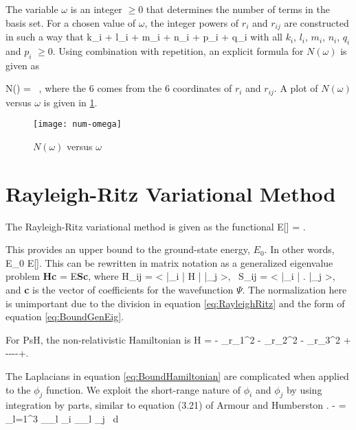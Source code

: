 \documentclass[Dissertation.tex]{subfiles}
\begin{document}
The variable $\omega$ is an integer $\geq 0$ that determines the number of terms in the basis set.  For a chosen value of $\omega$, the integer powers of $r_i$ and $r_{ij}$ are constructed in such a way that
\beq
\label{eq:OmegaDef}
k_i + l_i + m_i + n_i + p_i + q_i \leq \omega
\eeq
\noindent with all $k_i$, $l_i$, $m_i$, $n_i$, $q_i$ and $p_i$ $\geq 0$.  Using combination with repetition, an explicit formula for $N(\omega)$ is given as

\beq
\label{eq:NumberTermsOmega}
N(\omega) =  \, ,
\eeq
\noindent where the 6 comes from the 6 coordinates of $r_i$ and $r_{ij}$.  A plot of $N(\omega)$ versus $\omega$ is given in \cref{fig:NOmega}.

\begin{figure}[H]
	\centering
	\texttt{[image: num-omega]}
	\caption{$N(\omega)$ versus $\omega$}
	\label{fig:NOmega}
\end{figure}

\section{Rayleigh-Ritz Variational Method}
The Rayleigh-Ritz variational method is given as the functional \cite{Bransden2003}
\beq
\label{eq:RayleighRitz}
E[\Psi] = .
\eeq

\noindent This provides an upper bound to the ground-state energy, $E_0$.  In other words,
\beq
E_0 \leq E[\Psi].
\eeq
This can be rewritten in matrix notation as a generalized eigenvalue problem \cite{RayleighRitz}
\beq
\label{eq:BoundGenEig}
\textbf{Hc} = E\textbf{Sc},
\eeq
where
\beq
\label{eq:HijSij}
H_{ij} = \left< \bar{\phi}_i \left| H \right| \bar{\phi}_j \right>\!, \, S_{ij} = \left< \bar{\phi}_i \left| \right.\! \bar{\phi}_j \right>, 
\eeq
and \textbf{c} is the vector of coefficients for the wavefunction $\Psi$.  The normalization here is unimportant due to the division in equation \ref{eq:RayleighRitz} and the form of equation \ref{eq:BoundGenEig}.

For PsH, the non-relativistic Hamiltonian is
\beq
\label{eq:BoundHamiltonian}
H = - \nabla_{r_1}^2 -  \nabla_{r_2}^2 -  \nabla_{r_3}^2 + ----+.
\eeq

The Laplacians in equation \ref{eq:BoundHamiltonian} are complicated when applied to the $\phi_j$ function.  We exploit the short-range nature of $\phi_i$ and $\phi_j$ by using integration by parts, similar to equation (3.21) of Armour and Humberston \cite{Armour1991}.
\beq
\label{eq:BoundGradient}
- = \int \sum_{l=1}^3 \bm{\nabla}_{\!_l} \phi_i \bm{\cdot} \bm{\nabla}_{\!_l} \phi_j \, d\tau
\eeq
\end{document}
